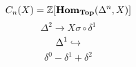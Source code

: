\documentclass[11pt]{amsproc}
\begin{document}



$$ C_n(X) = \mathbb{Z}[\mathbf{Hom}_{\mathbf{Top}}(\Delta^n, X)] $$
$$ \Delta^2 \to X \sigma \circ \delta^1$$
$$ \Delta^1 \hookrightarrow $$
$$ \delta^0 - \delta^1 + \delta^2 $$
\end{document}
